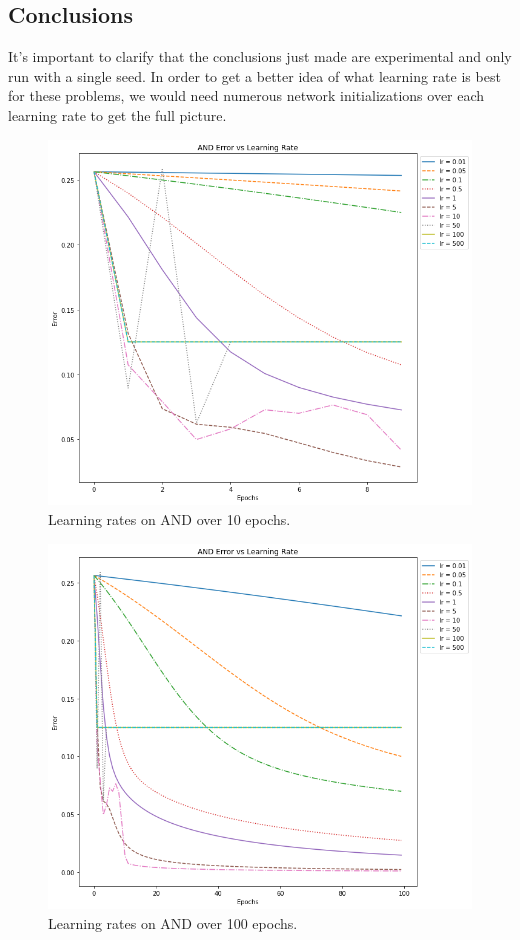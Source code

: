 \documentclass[12pt]{article}
\begin{document}
\subsection{Conclusions}

It's important to clarify that the conclusions just made are experimental and only run with a single seed.
In order to get a better idea of what learning rate is best for these problems, we would need numerous network initializations over each learning rate to get the full picture.

\begin{figure}[!htb]
  \centering
  \includegraphics[width=\linewidth]{and_10.png}
  \caption{Learning rates on AND over 10 epochs.}
  \label{fig:and10}
\end{figure}

\begin{figure}
  \centering
  \includegraphics[width=\linewidth]{and_100.png}
  \caption{Learning rates on AND over 100 epochs.}
  \label{fig:and100}
\end{figure}
\end{document}
